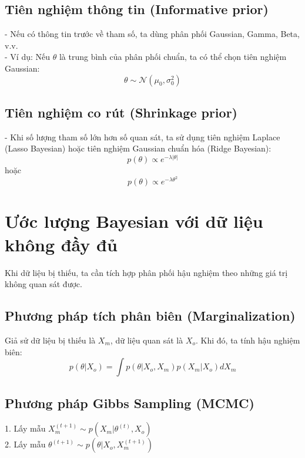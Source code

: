 \subsection{Tiên nghiệm thông tin (Informative prior)}
- Nếu có thông tin trước về tham số, ta dùng phân phối Gaussian, Gamma, Beta, v.v.\\
- Ví dụ: Nếu $\theta$ là trung bình của phân phối chuẩn, ta có thể chọn tiên nghiệm Gaussian:
  \begin{equation}
      \theta \sim \mathcal{N}(\mu_0, \sigma_0^2)
  \end{equation}

\subsection{Tiên nghiệm co rút (Shrinkage prior)}
- Khi số lượng tham số lớn hơn số quan sát, ta sử dụng tiên nghiệm Laplace (Lasso Bayesian) hoặc tiên nghiệm Gaussian chuẩn hóa (Ridge Bayesian):
  \begin{equation}
      p(\theta) \propto e^{-\lambda |\theta|}
  \end{equation}
  hoặc
  \begin{equation}
      p(\theta) \propto e^{-\lambda \theta^2}
  \end{equation}

\section{Ước lượng Bayesian với dữ liệu không đầy đủ}
Khi dữ liệu bị thiếu, ta cần tích hợp phân phối hậu nghiệm theo những giá trị không quan sát được.

\subsection{Phương pháp tích phân biên (Marginalization)}
Giả sử dữ liệu bị thiếu là $X_m$, dữ liệu quan sát là $X_o$. Khi đó, ta tính hậu nghiệm biên:
\begin{equation}
    p(\theta | X_o) = \int p(\theta | X_o, X_m) p(X_m | X_o) dX_m
\end{equation}

\subsection{Phương pháp Gibbs Sampling (MCMC)}
1. Lấy mẫu $X_m^{(t+1)} \sim p(X_m | \theta^{(t)}, X_o)$\\
2. Lấy mẫu $\theta^{(t+1)} \sim p(\theta | X_o, X_m^{(t+1)})$

